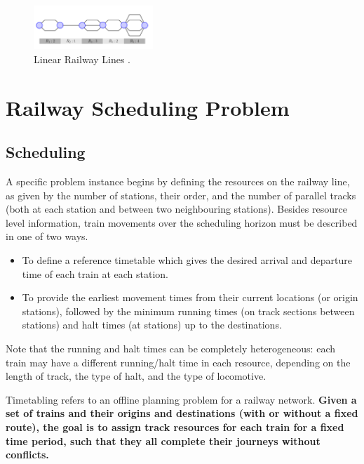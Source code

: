 \begin{figure}[H]
    \centering
    \includegraphics[width=0.4\textwidth]{report1}
    \caption{Linear Railway Lines \cite{ARTICLE:1}. }
    \label{image-myimage}
\end{figure}

\section{Railway Scheduling Problem}
\subsection{Scheduling}
A specific problem instance begins by defining the resources
on the railway line, as given by the number of stations, their
order, and the number of parallel tracks (both at each station
and between two neighbouring stations). Besides resource level information, 
train movements over the scheduling horizon must be described in one of two ways.
\begin{itemize}
    \item To define a reference timetable which gives the desired arrival
    and departure time of each train at each station.
    \item To provide the earliest movement times from their
    current locations (or origin stations), followed by the minimum
    running times (on track sections between stations) and halt
    times (at stations) up to the destinations.
\end{itemize}

\vspace{0.2cm}

Note that the running
and halt times can be completely heterogeneous: each train
may have a different running/halt time in each resource,
depending on the length of track, the type of halt, and the
type of locomotive.

\vspace{0.2cm}
Timetabling refers to an oﬄine planning problem for a railway network.
\textbf{Given a set of trains and their origins and destinations (with or without a ﬁxed route),
 the goal is to assign track resources for each train for a ﬁxed time period, 
 such that they all complete their journeys without conﬂicts.}

